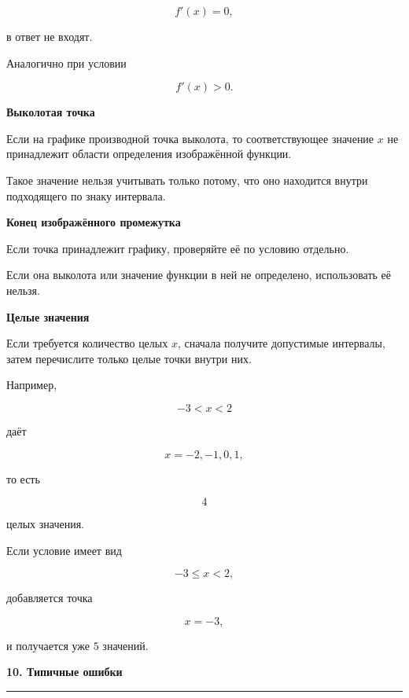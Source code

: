 \documentclass[a4paper,12pt]{article}
\newcommand{\maintitle}[1]{%
    {\Large\bfseries\color{darkaccent}#1\par}
    \vspace{2mm}
    {\color{accent}\rule{\linewidth}{0.6pt}}
    \vspace{4mm}
}
\newcommand{\subhead}[1]{%
    \vspace{3mm}
    {\large\bfseries\color{darkaccent}#1\par}
    \vspace{1mm}
}
\begin{document}
\[
f'(x)=0,
\]

в ответ не входят.

Аналогично при условии

\[
f'(x)>0.
\]

\subhead{Выколотая точка}

Если на графике производной точка выколота, то соответствующее значение
\(x\) не принадлежит области определения изображённой функции.

Такое значение нельзя учитывать только потому, что оно находится внутри
подходящего по знаку интервала.

\subhead{Конец изображённого промежутка}

Если точка принадлежит графику, проверяйте её по условию отдельно.

Если она выколота или значение функции в ней не определено,
использовать её нельзя.

\subhead{Целые значения}

Если требуется количество целых \(x\), сначала получите допустимые
интервалы, затем перечислите только целые точки внутри них.

Например,

\[
-3<x<2
\]

даёт

\[
x=-2,-1,0,1,
\]

то есть

\[
4
\]

целых значения.

Если условие имеет вид

\[
-3\le x<2,
\]

добавляется точка

\[
x=-3,
\]

и получается уже \(5\) значений.

\maintitle{10. Типичные ошибки}
\end{document}
